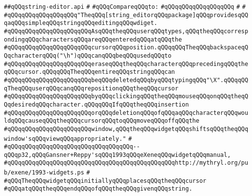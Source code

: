 \label{src/lib/x-kit/widget/old/text/string-editor.api}
\verb|##qQQqstring-editor.api|\newline
\verb|#|\newline
\verb|#qQQqCompareqQQqto:|\newline
\verb|#qQQqqQQqqQQqqQQqqQQq|\newline
\verb|#|\newline
\verb|#|\newline
\verb|#qQQqqQQqqQQqqQQqqQQq"TheqQQq[string_editorqQQqpackage]qQQqprovidesqQQqaqQQqsimpleqQQqstringqQQqeditingqQQqwdiget.|\newline
\verb|#qQQqqQQqqQQqqQQqqQQqqQQqAsqQQqtheqQQquserqQQqtypes,qQQqtheqQQqcorrespondingqQQqcharactersqQQqareqQQqenteredqQQqatqQQqthe|\newline
\verb|#qQQqqQQqqQQqqQQqqQQqqQQqcursorqQQqposition.qQQqqQQqTheqQQqbackspaceqQQqcharacterqQQq("\h")qQQqcanqQQqbeqQQqusedqQQqto|\newline
\verb|#qQQqqQQqqQQqqQQqqQQqqQQqeraseqQQqtheqQQqcharacterqQQqprecedingqQQqtheqQQqcursor.qQQqqQQqTheqQQqentireqQQqstringqQQqcan|\newline
\verb|#qQQqqQQqqQQqqQQqqQQqqQQqbeqQQqdeletedqQQqbyqQQqtypingqQQq"\X".qQQqqQQqTheqQQquserqQQqcanqQQqrepositionqQQqtheqQQqcursor|\newline
\verb|#qQQqqQQqqQQqqQQqqQQqqQQqbyqQQqclickingqQQqtheqQQqmouseqQQqonqQQqtheqQQqdesiredqQQqcharacter.qQQqqQQqIfqQQqtheqQQqinsertion|\newline
\verb|#qQQqqQQqqQQqqQQqqQQqqQQqorqQQqdeletionqQQqofqQQqaqQQqcharacterqQQqwouldqQQqcauseqQQqtheqQQqcursorqQQqtoqQQqmoveqQQqoffqQQqthe|\newline
\verb|#qQQqqQQqqQQqqQQqqQQqqQQqwindow,qQQqtheqQQqwidgetqQQqshiftsqQQqtheqQQqwindow'sqQQqviewqQQqappropriately."|\newline
\verb|#|\newline
\verb|#qQQqqQQqqQQqqQQqqQQqqQQqqQQqqQQqqQQq--qQQqp32,qQQqGansner+Reppy'sqQQq1993qQQqeXeneqQQqwidgetqQQqmanual,|\newline
\verb|#qQQqqQQqqQQqqQQqqQQqqQQqqQQqqQQqqQQqqQQqqQQqqQQqhttp://mythryl.org/pub/exene/1993-widgets.ps|\newline
\verb|#|\newline
\verb|#qQQqTheqQQqwidgetqQQqinitiallyqQQqplacesqQQqtheqQQqcursor|\newline
\verb|#qQQqatqQQqtheqQQqendqQQqofqQQqtheqQQqgivenqQQqstring.|\newline
